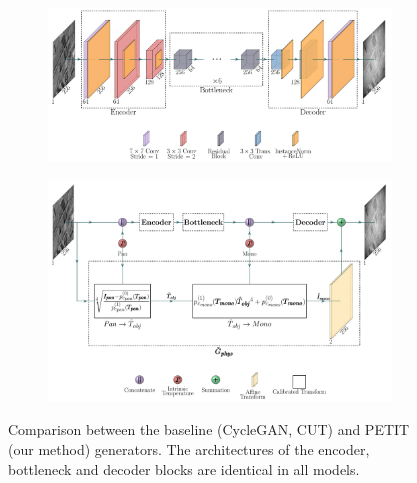 \begin{figure}[H]
  \centering
  \begin{subfigure}{\textwidth}
    \centering\includegraphics[width=\linewidth]{../figs/network/src/cut.pdf}
    \label{fig:backbone_models}
    \vspace{0.0cm}
  \end{subfigure}  
  \begin{subfigure}{\textwidth}
    \centering\includegraphics[width=\linewidth]{../figs/network/src/petit.pdf}
    \label{fig:PETIT_model}
  \end{subfigure}
  \caption{Comparison between the baseline (CycleGAN, CUT) and PETIT (our method) generators. The architectures of the encoder, bottleneck and decoder blocks are identical in all models.}
  \label{fig:arch_comp}
\end{figure}